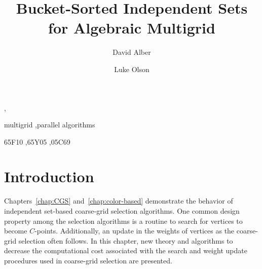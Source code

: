 \documentclass{elsart}
\begin{document}
\begin{frontmatter}


\title{Bucket-Sorted Independent Sets for Algebraic Multigrid}
\author{David Alber},
\author{Luke Olson}
\address{Department of Computer Science\\ University of Illinois at Urbana-Champaign}

\begin{abstract}
\end{abstract}

\begin{keyword}
multigrid \sep parallel algorithms

\MSC 65F10 \sep 65Y05 \sep 05C69
\end{keyword}
\end{frontmatter}


\section{Introduction}
Chapters~\ref{chap:CGS} and~\ref{chap:color-based} demonstrate the
behavior of independent set-based coarse-grid selection
algorithms. One common design property among the selection algorithms
is a routine to search for vertices to become
$C$-points. Additionally, an update in the weights of vertices as the
coarse-grid selection often follows. In this chapter, new theory and
algorithms to decrease the computational cost associated with the
search and weight update procedures used in coarse-grid selection are
presented.
\end{document}
